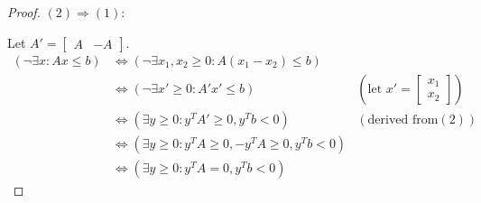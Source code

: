 \begin{proof}
        $(2)\Rightarrow(1)$:

        Let $A'=\left[
        \begin{matrix}
            A & -A
        \end{matrix}
        \right]$.
        \begin{align*}
            (\neg \exists x: Ax\le b) &\iff (\neg \exists x_1,x_2\ge 0: A(x_1-x_2)\le b) \\
            &\iff (\neg \exists x'\ge 0: A'x'\le b) &(\text{let }x'=\left[ \begin{matrix}x_1 \\x_2  \end{matrix} \right])\\
            &\iff (\exists y\ge 0 :y^{T}A'\ge 0,y^{T}b<0) &(\text{derived from} (2)) \\
            &\iff (\exists y\ge 0 :y^{T}A\ge 0,-y^{T}A\ge 0,y^{T}b<0) \\
            &\iff (\exists y\ge 0 :y^{T}A= 0,y^{T}b<0)
        \end{align*}
    \end{proof}


